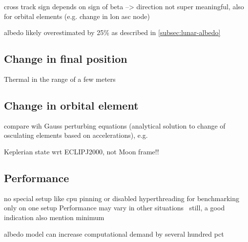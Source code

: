 cross track sign depends on sign of beta --> direction not super meaningful, also for orbital elements (e.g. change in lon asc node)

albedo likely overestimated by 25\% as described in \cref{subsec:lunar-albedo}



\subsection{Change in final position}

Thermal in the range of a few meters ~\cite{Mazarico2011}


\subsection{Change in orbital element}

compare wih Gauss perturbing equations (analytical solution to change of osculating elements based on accelerations), e.g. ~\cite[Sec.~3.2]{Lucchesi2006}

Keplerian state wrt ECLIPJ2000, not Moon frame!!




\subsection{Performance}
no special setup like cpu pinning or disabled hyperthreading for benchmarking
only on one setup
Performance may vary in other situations~\cite{Mytkowicz2009}
still, a good indication
also mention minimum

albedo model can increase computational demand by several hundred pct \cite{Nicholson2010}


